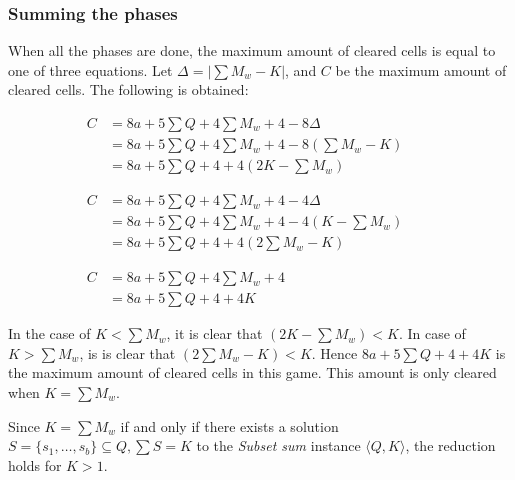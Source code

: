 \subsubsection{Summing the phases}

When all the phases are done, the maximum amount of cleared cells is equal to one of three equations. Let $\Delta = |\sum M_w - K|$, and $C$ be the maximum amount of cleared cells. The following is obtained:

\begin{equation} \tag{$K < \sum M_w$}
\begin{split}
C & = 8a + 5 \sum Q + 4 \sum M_w + 4 - 8 \Delta  \\
& = 8a + 5 \sum Q + 4 \sum M_w + 4 - 8 \left( \sum M_w - K\right) \phantom{+ 4K} \\
& = 8a + 5 \sum Q + 4 + 4 \left(2K - \sum M_w \right)
\end{split}
\end{equation}

\begin{equation} \tag{$K > \sum M_w$}
\begin{split}
C & = 8a + 5 \sum Q + 4 \sum M_w + 4 - 4 \Delta \\
& = 8a + 5 \sum Q + 4 \sum M_w + 4 - 4 \left( K - \sum M_w \right) \phantom{+ 4K} \\
& = 8a + 5 \sum Q + 4 + 4 \left(2 \sum M_w - K \right)
\end{split}
\end{equation}

\begin{equation} \tag{$K = \sum M_w$}
\begin{split}
C & = 8a + 5 \sum Q + 4 \sum M_w + 4 \phantom{- 8 \Delta} \\
& = 8a + 5 \sum Q + 4 + 4K \phantom{+ 4 \sum M_w - 8 \left(\sum M_w + K \right)}
\end{split}
\end{equation}

In the case of $K < \sum M_w$, it is clear that $\left(2K - \sum M_w \right) < K$. In case of $K > \sum M_w$, is is clear that $\left(2 \sum M_w - K \right) < K$. Hence $8a + 5 \sum Q + 4 + 4K$ is the maximum amount of cleared cells in this game. This amount is only cleared when $K = \sum M_w$.

Since $K = \sum M_w$ if and only if there exists a solution $S = \{s_1, \ldots, s_b \} \subseteq Q, \sum S = K$ to the \textit{Subset sum} instance $\langle Q, K \rangle$, the reduction holds for $K > 1$.
